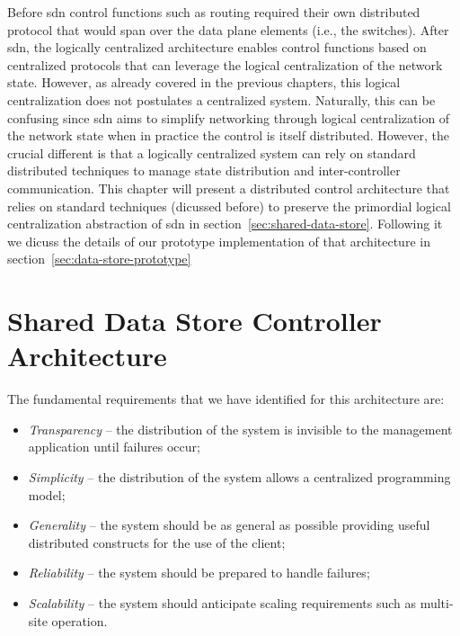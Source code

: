 
Before \gls{sdn} control functions such as routing required
their own distributed protocol that would span over the data plane
elements (i.e., the switches). 
After \gls{sdn},  the logically centralized architecture enables
control functions based on centralized protocols that can leverage
the logical centralization of the  network state.  
However, as already covered in the previous chapters, this logical
centralization does not postulates a centralized system. 
Naturally, this can be  confusing since \gls{sdn} aims to  
simplify networking through logical centralization of the network state when in practice the control is itself distributed.  
However, the crucial different is that a logically centralized system can rely on standard distributed techniques to manage state distribution and inter-controller communication.  
This chapter will present a distributed control architecture that relies on standard techniques (dicussed before) to  preserve the primordial logical centralization abstraction of \gls{sdn} in section~\ref{sec:shared-data-store}.  Following it we dicuss the details of our prototype implementation of that architecture in section~\ref{sec:data-store-prototype}

\section{Shared Data Store Controller Architecture} 
\glsresetall 
\label{sec:shared-data-store}

The fundamental requirements that we have identified for this architecture are: 

\begin{itemize}
\item[] \emph{Transparency} -- the distribution of the system is invisible to the management application until failures occur;
\item[] \emph{Simplicity}  -- the distribution of the system allows a centralized programming model; 
\item[] \emph{Generality} -- the system should be as general as
  possible providing useful distributed constructs for the use of the client;
\item[] \emph{Reliability} -- the system should be prepared to handle failures; 
\item[] \emph{Scalability} -- the system should anticipate scaling  requirements such as multi-site operation. 
\end{itemize}


